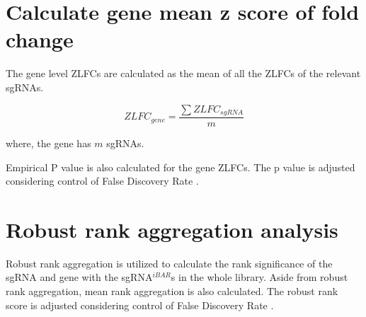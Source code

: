 \documentclass[11pt, a4paper]{article}
\begin{document}
\section{Calculate gene mean z score of fold change}

The gene level ZLFCs are calculated as the mean of all the ZLFCs of
the relevant sgRNAs.

$$ZLFC_{gene} = \frac{\sum{ZLFC_{sgRNA}}}{m}$$

where, the gene has $m$ sgRNAs.

Empirical P value is also calculated for the gene ZLFCs. The p value
is adjusted considering control of False Discovery Rate
\citep{benjamini_controlling_1995}.


\section{Robust rank aggregation analysis}


Robust rank aggregation \citep{kolde_robust_2012} is utilized to
calculate the rank significance of the sgRNA and gene with the
sgRNA$^{iBAR}$s in the whole library. Aside from robust rank
aggregation, mean rank aggregation is also calculated. The robust rank
score is adjusted considering control of False Discovery Rate
\citep{benjamini_controlling_1995}.


\end{document}
